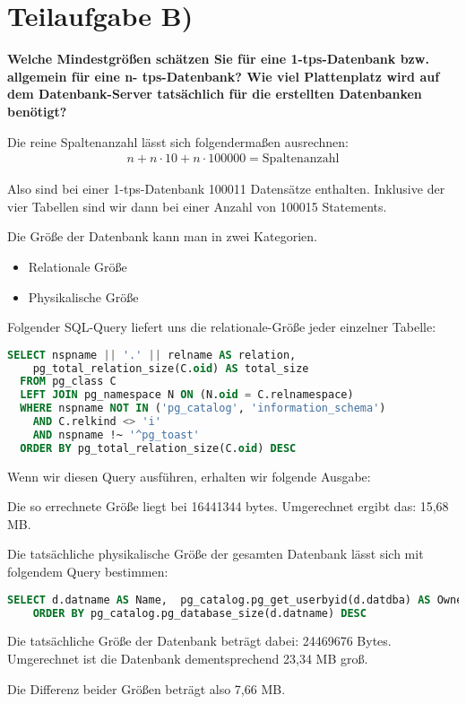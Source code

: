 \section{Teilaufgabe B)}
\textbf{Welche Mindestgrößen schätzen Sie für eine 1-tps-Datenbank bzw. allgemein für eine n-
tps-Datenbank? Wie viel Plattenplatz wird auf dem Datenbank-Server tatsächlich für die
erstellten Datenbanken benötigt?}

Die reine Spaltenanzahl lässt sich folgendermaßen ausrechnen:
\begin{eqnarray}
n + n \cdot 10 + n \cdot 100000 = \mbox{Spaltenanzahl}
\end{eqnarray}

Also sind bei einer 1-tps-Datenbank 100011 Datensätze enthalten. Inklusive der vier
Tabellen sind wir dann bei einer Anzahl von 100015 Statements.

Die Größe der Datenbank kann man in zwei Kategorien.
\begin{itemize}
  \item Relationale Größe
  \item Physikalische Größe
\end{itemize}

Folgender SQL-Query liefert uns die relationale-Größe jeder einzelner Tabelle:
\begin{lstlisting}[language=sql, caption={Größe der Tabelle und Datensätze
ermitteln}]
  SELECT nspname || '.' || relname AS relation,
    pg_total_relation_size(C.oid) AS total_size
  FROM pg_class C
  LEFT JOIN pg_namespace N ON (N.oid = C.relnamespace)
  WHERE nspname NOT IN ('pg_catalog', 'information_schema')
    AND C.relkind <> 'i'
    AND nspname !~ '^pg_toast'
  ORDER BY pg_total_relation_size(C.oid) DESC
\end{lstlisting}

Wenn wir diesen Query ausführen, erhalten wir folgende Ausgabe:

Die so errechnete Größe liegt bei 16441344 bytes. Umgerechnet ergibt das: 
15,68 MB.

Die tatsächliche physikalische Größe der gesamten Datenbank lässt sich mit
folgendem Query bestimmen:
\begin{lstlisting}[language=sql, caption={Physikalische Größe der Datenbank
ermitteln}]
SELECT d.datname AS Name,  pg_catalog.pg_get_userbyid(d.datdba) AS Owner, pg_catalog.pg_database_size(d.datname) AS SIZE FROM pg_catalog.pg_database d
    ORDER BY pg_catalog.pg_database_size(d.datname) DESC
\end{lstlisting}

Die tatsächliche Größe der Datenbank beträgt dabei: 24469676 Bytes. Umgerechnet
ist die Datenbank dementsprechend 23,34 MB groß.

Die Differenz beider Größen beträgt also 7,66 MB.
